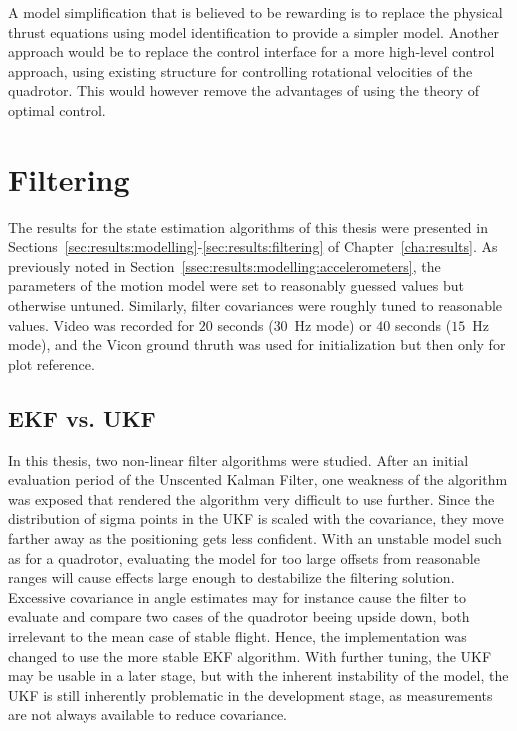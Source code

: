         A model simplification that is believed to be rewarding
        is to replace the physical thrust equations using model identification
        to provide a simpler model. Another approach would be to replace the
        control interface for a more high-level control approach, using
        existing structure for controlling rotational velocities of the
        quadrotor. This would however remove the advantages of using
        the theory of optimal control.

    \section{Filtering}
        The results for the state estimation algorithms of this thesis
        were presented in Sections~\ref{sec:results:modelling}-\ref{sec:results:filtering} of Chapter~\ref{cha:results}.
        As previously noted in Section~\ref{ssec:results:modelling:accelerometers},
        the parameters of the motion model were set to reasonably guessed values
        but otherwise untuned. Similarly, filter covariances were roughly
        tuned to reasonable values. Video was recorded for $20$ seconds ($30$~Hz mode)
        or $40$ seconds ($15$~Hz mode), and the Vicon ground thruth was used for
        initialization but then only for plot reference.

        \subsection{EKF vs. UKF}
            In this thesis, two non-linear filter algorithms were studied.
            After an initial evaluation period of the Unscented Kalman Filter,
            one weakness of the algorithm was exposed that rendered the
            algorithm very difficult to use further.
            Since the distribution of sigma points in the UKF is scaled with
            the covariance, they move farther away as the positioning gets
            less confident.
            With an unstable model such as for a quadrotor,
            evaluating the model for too large offsets from reasonable ranges
            will cause effects large enough to destabilize the filtering solution.
            Excessive covariance in angle estimates may for instance
            cause the filter to evaluate and compare two cases of the quadrotor
            beeing upside down, both irrelevant to the mean case of stable flight.
            Hence, the implementation was changed to use the more stable EKF algorithm.
            With further tuning, the UKF may be usable in a later stage, but with the inherent
            instability of the model, the UKF is still inherently problematic in
            the development stage, as measurements are not always
            available to reduce covariance.

